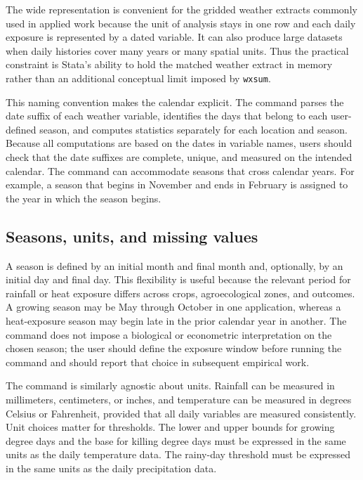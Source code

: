 The wide representation is convenient for the gridded weather extracts commonly used in applied work because the unit of analysis stays in one row and each daily exposure is represented by a dated variable. It can also produce large datasets when daily histories cover many years or many spatial units. Thus the practical constraint is Stata's ability to hold the matched weather extract in memory rather than an additional conceptual limit imposed by \texttt{wxsum}.

This naming convention makes the calendar explicit. The command parses the date suffix of each weather variable, identifies the days that belong to each user-defined season, and computes statistics separately for each location and season. Because all computations are based on the dates in variable names, users should check that the date suffixes are complete, unique, and measured on the intended calendar. The command can accommodate seasons that cross calendar years. For example, a season that begins in November and ends in February is assigned to the year in which the season begins.

\subsection{Seasons, units, and missing values}

A season is defined by an initial month and final month and, optionally, by an initial day and final day. This flexibility is useful because the relevant period for rainfall or heat exposure differs across crops, agroecological zones, and outcomes. A growing season may be May through October in one application, whereas a heat-exposure season may begin late in the prior calendar year in another. The command does not impose a biological or econometric interpretation on the chosen season; the user should define the exposure window before running the command and should report that choice in subsequent empirical work.

The command is similarly agnostic about units. Rainfall can be measured in millimeters, centimeters, or inches, and temperature can be measured in degrees Celsius or Fahrenheit, provided that all daily variables are measured consistently. Unit choices matter for thresholds. The lower and upper bounds for growing degree days and the base for killing degree days must be expressed in the same units as the daily temperature data. The rainy-day threshold must be expressed in the same units as the daily precipitation data.

